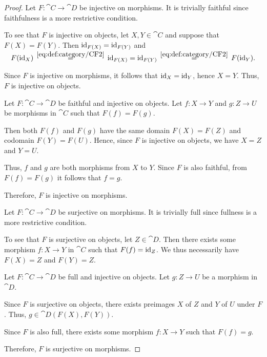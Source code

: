 \begin{proof}
  \SufficiencySubProof* Let \( F: \cat{C} \to \cat{D} \) be injective on morphisms. It is trivially faithful since faithfulness is a more restrictive condition.

  To see that \( F \) is injective on objects, let \( X, Y \in \cat{C} \) and suppose that \( F(X) = F(Y) \). Then \( \operatorname{id}_{F(X)} = \operatorname{id}_{F(Y)} \) and
  \begin{equation*}
    F(\id_X)
    \reloset {\eqref{eq:def:category/CF2}} =
    \id_{F(X)}
    =
    \id_{F(Y)}
    \reloset {\eqref{eq:def:category/CF2}} =
    F(\id_Y).
  \end{equation*}

  Since \( F \) is injective on morphisms, it follows that \( \operatorname{id}_X = \operatorname{id}_Y \), hence \( X = Y \). Thus, \( F \) is injective on objects.

  \NecessitySubProof* Let \( F: \cat{C} \to \cat{D} \) be faithful and injective on objects. Let \( f: X \to Y \) and \( g: Z \to U \) be morphisms in \( \cat{C} \) such that \( F(f) = F(g) \).

  Then both \( F(f) \) and \( F(g) \) have the same domain \( F(X) = F(Z) \) and codomain \( F(Y) = F(U) \). Hence, since \( F \) is injective on objects, we have \( X = Z \) and \( Y = U \).

  Thus, \( f \) and \( g \) are both morphisms from \( X \) to \( Y \). Since \( F \) is also faithful, from \( F(f) = F(g) \) it follows that \( f = g \).

  Therefore, \( F \) is injective on morphisms.

  \SufficiencySubProof* Let \( F: \cat{C} \to \cat{D} \) be surjective on morphisms. It is trivially full since fullness is a more restrictive condition.

  To see that \( F \) is surjective on objects, let \( Z \in \cat{D} \). Then there exists some morphism \( f: X \to Y \) in \( \cat{C} \) such that \( F(f) = \operatorname{id}_Z \). We thus necessarily have \( F(X) = Z \) and \( F(Y) = Z \).

  \NecessitySubProof* Let \( F: \cat{C} \to \cat{D} \) be full and injective on objects. Let \( g: Z \to U \) be a morphism in \( \cat{D} \).

  Since \( F \) is surjective on objects, there exists preimages \( X \) of \( Z \) and \( Y \) of \( U \) under \( F \). Thus, \( g \in \cat{D}(F(X), F(Y)) \).

  Since \( F \) is also full, there exists some morphism \( f: X \to Y \) such that \( F(f) = g \).

  Therefore, \( F \) is surjective on morphisms.
\end{proof}

